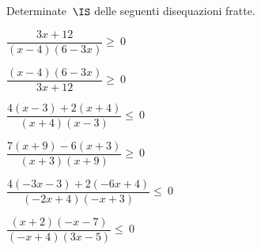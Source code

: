 \begin{esercizio}[]
\label{ese:21.55}
Determinate~\(\IS\) delle seguenti disequazioni fratte.
\begin{enumeratea}
\spazielenx
\item \(\dfrac{3x+12}{(x-4)(6-3x)}\geqslant~0\)
\item \(\dfrac{(x-4)(6-3x)}{3x+12}\geqslant~0\)
\item \(\dfrac{4(x-3)+2(x+4)}{(x+4)(x-3)}\leqslant~0\)
\item \(\dfrac{7(x+9)-6(x+3)}{(x+3)(x+9)}\geqslant~0\)
\item \(\dfrac{4(-3x-3)+2(-6x+4)}{(-2x+4)(-x+3)}\leqslant~0\)
\item \(\dfrac{(x+2)(-x-7)}{(-x+4)(3x-5)}\leqslant~0\)
\end{enumeratea}
\end{esercizio}


